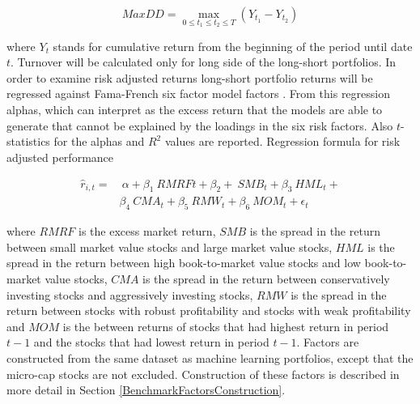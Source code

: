 \documentclass{article}
\begin{document}
\begin{equation}
\label{eq:maxDD}
MaxDD = \max\limits_{0\leq t_1\leq t_2\leq T} (Y_{t_1} - Y_{t_2})
\end{equation}

where $Y_t$ stands for cumulative return from the beginning of the period until date $t$. Turnover will be calculated only for long side of the long-short portfolios. In order to examine risk adjusted returns long-short portfolio returns will be regressed against Fama-French \citeyear{FAMA20151} six factor model factors \footnotemark. From this regression alphas, which can interpret as the excess return that the models are able to generate that cannot be explained by the loadings in the six risk factors. Also $t$-statistics for the alphas and $R^2$ values are reported. Regression formula for risk adjusted performance \par

\begin{equation}
\label{eq:FFRegFormula}
\begin{split}
\hat r_{i, t} = 	& \ \alpha+ \beta_{1} \ RMRF{t} + \beta_{2} + \ SMB_{t} + \beta_{3} \ HML_{t} + \\
		&  \beta_{4} \ CMA_{t} +  \beta_{5} \ RMW_{t} + \beta_{6} \ MOM_{t} + \epsilon_{t}
\end{split}
\end{equation}

where $RMRF$ is the excess market return, $SMB$ is the spread in the return between small market value stocks and large market value stocks, $HML$ is the spread in the return between high book-to-market value stocks and low book-to-market value stocks, $CMA$ is the spread in the return between conservatively investing stocks and aggressively investing stocks, $RMW$ is the spread in the return between stocks with robust profitability and stocks with weak profitability and $MOM$ is the between returns of stocks that had highest return in period $t-1$ and the stocks that had lowest return in period $t-1$. Factors are constructed from the same dataset as machine learning portfolios, except that the micro-cap stocks are not excluded. Construction of these factors is described in more detail in Section \ref{BenchmarkFactorsConstruction}. \par

\end{document}
